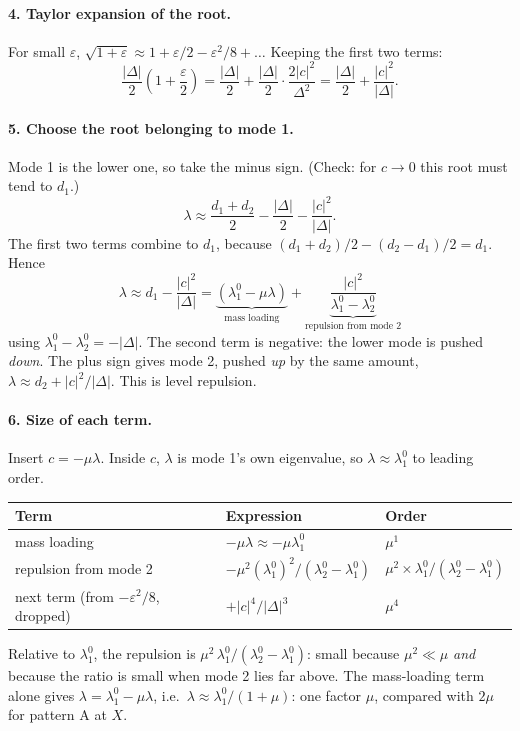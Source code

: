 \paragraph{4. Taylor expansion of the root.}
For small $\varepsilon$, $\sqrt{1+\varepsilon} \approx 1 + \varepsilon/2 - \varepsilon^2/8 + \dots$
Keeping the first two terms:
\begin{equation}
  \frac{|\Delta|}{2}\left(1 + \frac{\varepsilon}{2}\right)
  = \frac{|\Delta|}{2} + \frac{|\Delta|}{2}\cdot\frac{2|c|^2}{\Delta^2}
  = \frac{|\Delta|}{2} + \frac{|c|^2}{|\Delta|} .
\end{equation}

\paragraph{5. Choose the root belonging to mode 1.}
Mode 1 is the lower one, so take the minus sign. (Check: for $c \to 0$ this
root must tend to $d_1$.)
\begin{equation}
  \lambda \approx \frac{d_1 + d_2}{2} - \frac{|\Delta|}{2} - \frac{|c|^2}{|\Delta|} .
\end{equation}
The first two terms combine to $d_1$, because
$(d_1 + d_2)/2 - (d_2 - d_1)/2 = d_1$. Hence
\begin{equation}
  \boxed{\;\lambda \approx d_1 - \frac{|c|^2}{|\Delta|}
  = \underbrace{(\lambda_1^0 - \mu\lambda)}_{\text{mass loading}}
  + \underbrace{\frac{|c|^2}{\lambda_1^0 - \lambda_2^0}}_{\text{repulsion from mode 2}}\;}
\end{equation}
using $\lambda_1^0 - \lambda_2^0 = -|\Delta|$. The second term is negative:
the lower mode is pushed \emph{down}. The plus sign gives mode 2, pushed
\emph{up} by the same amount, $\lambda \approx d_2 + |c|^2/|\Delta|$. This is
level repulsion.

\paragraph{6. Size of each term.}
Insert $c = -\mu\lambda$. Inside $c$, $\lambda$ is mode 1's own eigenvalue, so
$\lambda \approx \lambda_1^0$ to leading order.
\begin{center}
\begin{tabular}{|l|l|l|}
\hline
Term & Expression & Order \\
\hline
mass loading & $-\mu\lambda \approx -\mu\lambda_1^0$ & $\mu^1$ \\
repulsion from mode 2 & $-\mu^2 (\lambda_1^0)^2/(\lambda_2^0 - \lambda_1^0)$ & $\mu^2 \times \lambda_1^0/(\lambda_2^0 - \lambda_1^0)$ \\
next term (from $-\varepsilon^2/8$, dropped) & $+|c|^4/|\Delta|^3$ & $\mu^4$ \\
\hline
\end{tabular}
\end{center}
Relative to $\lambda_1^0$, the repulsion is
$\mu^2\, \lambda_1^0/(\lambda_2^0 - \lambda_1^0)$: small because
$\mu^2 \ll \mu$ \emph{and} because the ratio is small when mode 2 lies far
above. The mass-loading term alone gives $\lambda = \lambda_1^0 - \mu\lambda$,
i.e.\ $\lambda \approx \lambda_1^0/(1+\mu)$: one factor $\mu$, compared with
$2\mu$ for pattern A at $X$.

